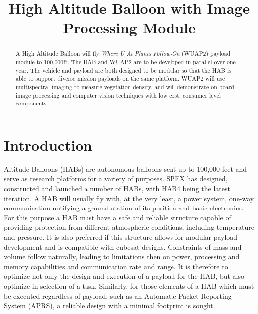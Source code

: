 \documentclass[conference]{IEEEtran} %
\title{High Altitude Balloon with Image Processing Module}
\author{
  \IEEEauthorblockN{%
    Keshav~Adhyay\IEEEauthorrefmark{1}
    Philip~Linden\IEEEauthorrefmark{2}
  }
  \IEEEauthorblockA{%
    RIT Space Exploration, Rochester Institute of Technology \\ %
    Rochester, N.Y. \\
    Email:
    \IEEEauthorrefmark{1}keshavadhyay@gmail.com
    \IEEEauthorrefmark{2}pjl7651@rit.edu
  }

}
\begin{document}
\maketitle%

\begin{abstract}
  A High Altitude Balloon will fly \textit{Where U At Plants Follow-On} (WUAP2) payload module to 100,000ft. 
  The HAB and WUAP2 are to be developed in parallel over one year. 
  The vehicle and payload are both designed to be modular so that the HAB is able to support diverse mission payloads on the same platform. 
  WUAP2 will use multispectral imaging to measure vegetation density, and will demonstrate on-board image processing and computer vision techniques with low cost, consumer level components.

\end{abstract}

\section{Introduction}
 Altitude Balloons (HABs) are autonomous balloons sent up to 100,000 feet and serve as research platforms for a variety of purposes. 
SPEX has designed, constructed and launched a number of HABs, with HAB4 being the latest iteration. 
A HAB will usually fly with, at the very least, a power system, one-way communication notifying a ground station of its position and basic electronics. 
For this purpose a HAB must have a safe and reliable structure capable of providing protection from different atmospheric conditions, including temperature and pressure. 
It is also preferred if this structure allows for modular payload development and is compatible with cubesat designs. 
Constraints of mass and volume follow naturally, leading to limitations then on power, processing and memory capabilities and communication rate and range. 
It is therefore to optimize not only the design and execution of a payload for the HAB, but also optimize in selection of a task. 
Similarly, for those elements of a HAB which must be executed regardless of payload, such as an Automatic Packet Reporting System (APRS), a reliable design with a minimal footprint is sought.
\end{document}
